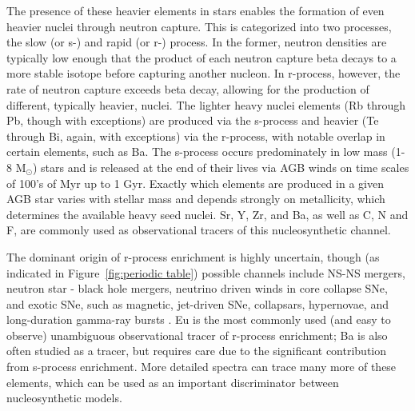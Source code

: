 The presence of these heavier elements in stars enables the formation of even heavier nuclei through neutron capture. This is categorized into two processes, the slow (or s-) and rapid (or r-) process. In the former, neutron densities are typically low enough that the product of each neutron capture beta decays to a more stable isotope before capturing another nucleon. In r-process, however, the rate of neutron capture exceeds beta decay, allowing for the production of different, typically heavier, nuclei. The lighter heavy nuclei elements (Rb through Pb, though with exceptions) are produced via the s-process and heavier (Te through Bi, again, with exceptions) via the r-process, with notable overlap in certain elements, such as Ba.
The s-process occurs predominately in low mass (1-8 M$_{\odot}$) stars and is released at the end of their lives via AGB winds on time scales of 100's of Myr up to 1 Gyr. Exactly which elements are produced in a given AGB star varies with stellar mass and depends strongly on metallicity, which determines the available heavy seed nuclei. Sr, Y, Zr, and Ba, as well as C, N and F, are commonly used as observational tracers of this nucleosynthetic channel.

The dominant origin of r-process enrichment is highly uncertain, though (as indicated in Figure~\ref{fig:periodic table}) possible channels include NS-NS mergers, neutron star - black hole mergers, neutrino driven winds in core collapse SNe, and exotic SNe, such as magnetic, jet-driven SNe, collapsars, hypernovae, and long-duration gamma-ray bursts \citep[see ][ for recent reviews]{Frebel2018, Cowan2019}. Eu is the most commonly used (and easy to observe) unambiguous observational tracer of r-process enrichment; Ba is also often studied as a tracer, but requires care due to the significant contribution from s-process enrichment. More detailed spectra \citep[e.g.][]{Ji2018a} can trace many more of these elements, which can be used as an important discriminator between nucleosynthetic models.

